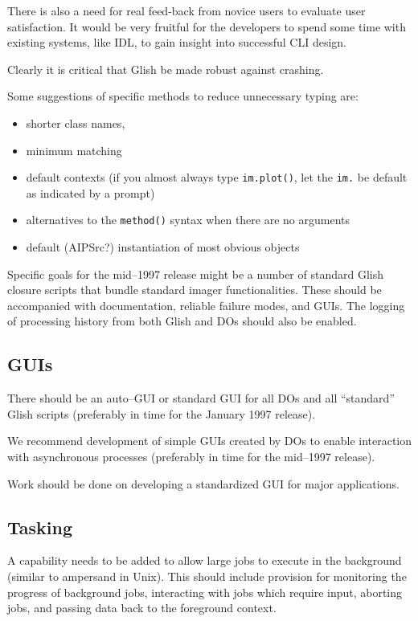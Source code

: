 There is also a need for real feed-back from novice users to evaluate
user satisfaction. It would be very fruitful for the developers to
spend some time with existing systems, like IDL, to gain insight into
successful CLI design.

Clearly it is critical that Glish be made robust against crashing.

Some suggestions of specific methods to reduce unnecessary typing are:
\begin{itemize}
\item shorter class names, 
\item minimum matching
\item default contexts (if you almost always type {\tt im.plot()}, let the
   {\tt im.} be default as indicated by a prompt)
\item  alternatives to the {\tt method()} syntax when there are no arguments
\item default (AIPSrc?) instantiation of most obvious objects
\end{itemize}

Specific goals for the mid--1997 release might be a number of standard
Glish closure scripts that bundle standard imager functionalities.
These should be accompanied with documentation, reliable failure
modes, and GUIs. The logging of processing history from both Glish
and DOs should also be enabled.

\subsection{GUIs}

There should be an auto--GUI or standard GUI for all DOs and all
``standard'' Glish scripts (preferably in time for the January 1997
release). 

We recommend development of simple GUIs created by DOs to enable
interaction with asynchronous processes (preferably in time for the
mid--1997 release).

Work should be done on developing a standardized GUI for major
applications. 

\subsection{Tasking}

A capability needs to be added to allow large jobs to execute in the
background (similar to ampersand in Unix).  This should include
provision for monitoring the progress of background jobs, interacting
with jobs which require input, aborting jobs, and passing data back
to the foreground context.

